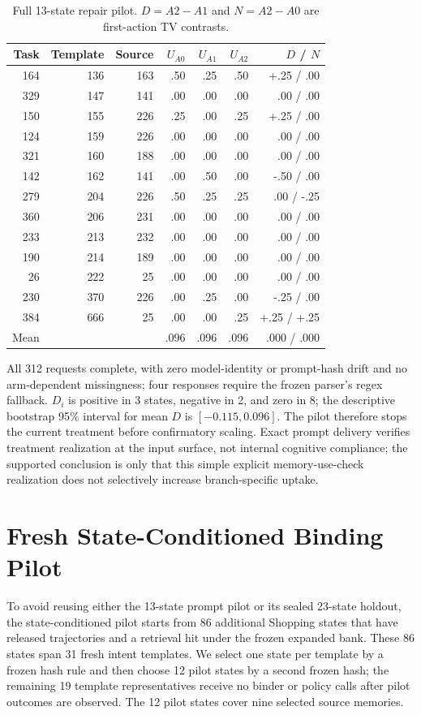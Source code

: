 \begin{table}[h]
\centering
\scriptsize
\caption{Full 13-state repair pilot. $D=A2-A1$ and $N=A2-A0$ are first-action TV contrasts.}
\label{tab:repair-pilot-full}
\begin{tabular}{rrrrrrr}
\toprule
Task & Template & Source & $U_{A0}$ & $U_{A1}$ & $U_{A2}$ & $D$ / $N$ \\
\midrule
164 & 136 & 163 & .50 & .25 & .50 & +.25 / .00 \\
329 & 147 & 141 & .00 & .00 & .00 & .00 / .00 \\
150 & 155 & 226 & .25 & .00 & .25 & +.25 / .00 \\
124 & 159 & 226 & .00 & .00 & .00 & .00 / .00 \\
321 & 160 & 188 & .00 & .00 & .00 & .00 / .00 \\
142 & 162 & 141 & .00 & .50 & .00 & -.50 / .00 \\
279 & 204 & 226 & .50 & .25 & .25 & .00 / -.25 \\
360 & 206 & 231 & .00 & .00 & .00 & .00 / .00 \\
233 & 213 & 232 & .00 & .00 & .00 & .00 / .00 \\
190 & 214 & 189 & .00 & .00 & .00 & .00 / .00 \\
26  & 222 & 25  & .00 & .00 & .00 & .00 / .00 \\
230 & 370 & 226 & .00 & .25 & .00 & -.25 / .00 \\
384 & 666 & 25  & .00 & .00 & .25 & +.25 / +.25 \\
\midrule
Mean & & & .096 & .096 & .096 & .000 / .000 \\
\bottomrule
\end{tabular}
\end{table}

All 312 requests complete, with zero model-identity or prompt-hash drift and no arm-dependent missingness; four responses require the frozen parser's regex fallback. $D_i$ is positive in 3 states, negative in 2, and zero in 8; the descriptive bootstrap 95\% interval for mean $D$ is $[-0.115,0.096]$. The pilot therefore stops the current treatment before confirmatory scaling. Exact prompt delivery verifies treatment realization at the input surface, not internal cognitive compliance; the supported conclusion is only that this simple explicit memory-use-check realization does not selectively increase branch-specific uptake.

\section{Fresh State-Conditioned Binding Pilot}
\label{sec:scmb-pilot-details}
To avoid reusing either the 13-state prompt pilot or its sealed 23-state holdout, the state-conditioned pilot starts from 86 additional Shopping states that have released trajectories and a retrieval hit under the frozen expanded bank. These 86 states span 31 fresh intent templates. We select one state per template by a frozen hash rule and then choose 12 pilot states by a second frozen hash; the remaining 19 template representatives receive no binder or policy calls after pilot outcomes are observed. The 12 pilot states cover nine selected source memories.

